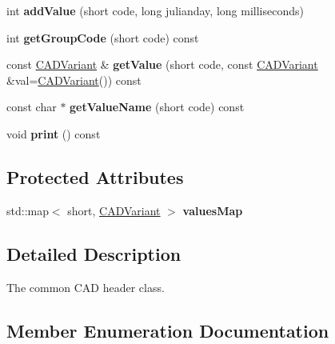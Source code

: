 \begin{DoxyCompactItemize}
\item 
int {\bfseries add\+Value} (short code, long julianday, long milliseconds)\hypertarget{class_c_a_d_header_a2d652dc82fef10ae68e22eec3881eef6}{}\label{class_c_a_d_header_a2d652dc82fef10ae68e22eec3881eef6}

\item 
int {\bfseries get\+Group\+Code} (short code) const \hypertarget{class_c_a_d_header_a4179a7f07f613d7cdb4616682be1f0e6}{}\label{class_c_a_d_header_a4179a7f07f613d7cdb4616682be1f0e6}

\item 
const \hyperlink{class_c_a_d_variant}{C\+A\+D\+Variant} \& {\bfseries get\+Value} (short code, const \hyperlink{class_c_a_d_variant}{C\+A\+D\+Variant} \&val=\hyperlink{class_c_a_d_variant}{C\+A\+D\+Variant}()) const \hypertarget{class_c_a_d_header_a02948a3df4e9ca9d1433ab8bd23001a6}{}\label{class_c_a_d_header_a02948a3df4e9ca9d1433ab8bd23001a6}

\item 
const char $\ast$ {\bfseries get\+Value\+Name} (short code) const \hypertarget{class_c_a_d_header_a16a7d769a8b50940a84f199cae857a55}{}\label{class_c_a_d_header_a16a7d769a8b50940a84f199cae857a55}

\item 
void {\bfseries print} () const \hypertarget{class_c_a_d_header_a3a4a94f0b0bc51a9bdf358e4385ed5c9}{}\label{class_c_a_d_header_a3a4a94f0b0bc51a9bdf358e4385ed5c9}

\end{DoxyCompactItemize}
\subsection*{Protected Attributes}
\begin{DoxyCompactItemize}
\item 
std\+::map$<$ short, \hyperlink{class_c_a_d_variant}{C\+A\+D\+Variant} $>$ {\bfseries values\+Map}\hypertarget{class_c_a_d_header_a264f6f84f2f54d0bc50ca33139b2e8a5}{}\label{class_c_a_d_header_a264f6f84f2f54d0bc50ca33139b2e8a5}

\end{DoxyCompactItemize}


\subsection{Detailed Description}
The common C\+AD header class. 

\subsection{Member Enumeration Documentation}
